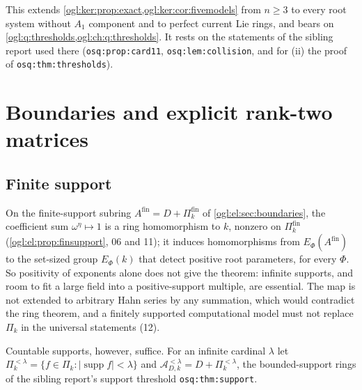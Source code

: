 \documentclass[11pt,oneside]{article}
\numberwithin{equation}{section}
\theoremstyle{definition}
\theoremstyle{remark}
\newcommand{\A}{\mathcal A}
\newcommand{\supp}{\operatorname{supp}}
\newcommand{\replabel}[1]{\nolinkurl{#1}}
\begin{document}
This extends \cref{ogl:ker:prop:exact,ogl:ker:cor:fivemodels} from $n\ge3$
to every root system without $A_1$ component and to perfect current Lie rings,
and bears on \cref{ogl:q:thresholds,ogl:ch:q:thresholds}. It rests on the
statements of the sibling report used there (\replabel{osq:prop:card11},
\replabel{osq:lem:collision}, and for (ii) the proof of
\replabel{osq:thm:thresholds}).

\section{Boundaries and explicit rank-two matrices}\label{ogl:ch:sec:boundaries}

\subsection{Finite support}
On the finite-support subring $A^{\mathrm{fin}}=D+\Pi_k^{\mathrm{fin}}$ of
\cref{ogl:el:sec:boundaries}, the coefficient sum $\omega^\eta\mapsto1$ is a ring
homomorphism to $k$, nonzero on $\Pi_k^{\mathrm{fin}}$
(\cref{ogl:el:prop:finsupport}, 06 and 11); it induces homomorphisms from
$E_\Phi(A^{\mathrm{fin}})$ to the set-sized group $E_\Phi(k)$ that detect positive
root parameters, for every $\Phi$. So positivity of exponents alone does not give
the theorem: infinite supports, and room to fit a large field into a
positive-support multiple, are essential. The map is not extended to arbitrary
Hahn series by any summation, which would contradict the ring theorem, and a
finitely supported computational model must not replace $\Pi_k$ in the
universal statements (12).

Countable supports, however, suffice. For an infinite cardinal $\lambda$ let
$\Pi_k^{<\lambda}=\{f\in\Pi_k:|\supp f|<\lambda\}$ and
$\A^{<\lambda}_{D,k}=D+\Pi_k^{<\lambda}$, the bounded-support rings of the sibling
report's support threshold \replabel{osq:thm:support}.
\end{document}
